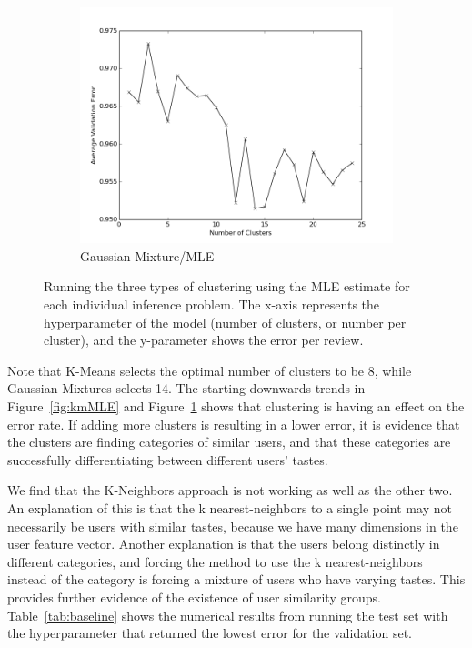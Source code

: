 \documentclass[11pt]{article}
\begin{document}
\begin{figure}[h!]
\begin{subfigure}[h!]{0.33\textwidth}
        \includegraphics[width=\textwidth]{GM_mle.png}
        \caption{Gaussian Mixture/MLE}
        \label{fig:gmMLE}
    \end{subfigure}
    \caption{Running the three types of clustering using the MLE estimate for each individual inference problem. The x-axis represents the hyperparameter of the model (number of clusters, or number per cluster), and the y-parameter shows the error per review.}
    \label{fig:MLE}
\end{figure}

Note that K-Means selects the optimal number of clusters to be 8, while Gaussian Mixtures selects 14. The starting downwards trends in Figure~\ref{fig:kmMLE} and Figure~\ref{fig:gmMLE} shows that clustering is having an effect on the error rate. If adding more clusters is resulting in a lower error, it is evidence that the clusters are finding categories of similar users, and that these categories are successfully differentiating between different users' tastes.

We find that the K-Neighbors approach is not working as well as the other two. An explanation of this is that the k nearest-neighbors to a single point may not necessarily be users with similar tastes, because we have many dimensions in the user feature vector. Another explanation is that the users belong distinctly in different categories, and forcing the method to use the k nearest-neighbors instead of the category is forcing a mixture of users who have varying tastes. This provides further evidence of the existence of user similarity groups. Table~\ref{tab:baseline} shows the numerical results from running the test set with the hyperparameter that returned the lowest error for the validation set.
\end{document}
